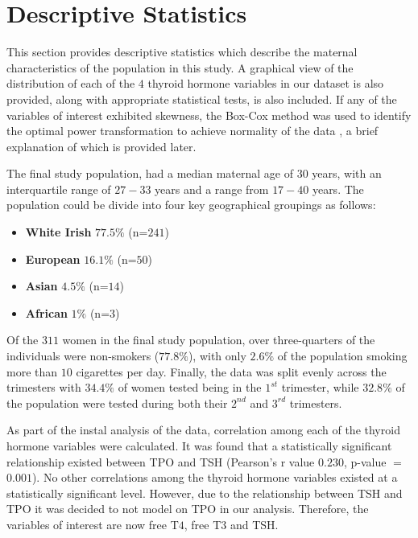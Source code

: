 \documentclass[12pt,a4paper]{report}
\begin{document}
\section{Descriptive Statistics}
This section provides descriptive statistics which describe the maternal characteristics of the population in this study. A graphical view of the distribution of each of the $4$ thyroid hormone variables in our dataset is also provided, along with appropriate statistical tests, is also included. If any of the variables of interest exhibited skewness, the Box-Cox method was used to identify the optimal power transformation to achieve normality of the data \citep{BoxCox1964}, a brief explanation of which is provided later.
\vspace{2mm}

The final study population, had a median maternal age of $30$ years, with an interquartile range of $27-33$ years and a range from $17-40$ years. The population could be divide into four key geographical groupings as follows:
\begin{itemize}
    \item {\textbf{White Irish}} $77.5\%$ (n=$241$)
    \item {\textbf{European}} $16.1\%$ (n=$50$)
    \item {\textbf{Asian}} $4.5\%$ (n=$14$)
    \item {\textbf{African}} $1\%$ (n=$3$)
\end{itemize}
\vspace{2mm}

Of the $311$ women in the final study population, over three-quarters of the individuals were non-smokers ($77.8\%$), with only $2.6\%$ of the population smoking more than $10$ cigarettes per day. Finally, the data was split evenly across the trimesters with $34.4\%$ of women tested being in the $1^{st}$ trimester, while $32.8\%$ of the population were tested during both their $2^{nd}$ and $3^{rd}$ trimesters.

\vspace{2mm}

As part of the instal analysis of the data, correlation among each of the thyroid hormone variables were calculated. It was found that a statistically significant relationship existed between TPO and TSH (Pearson's r value $0.230$, p-value $=$ $0.001$). No other correlations among the thyroid hormone variables existed at a statistically significant level. However, due to the relationship between TSH and TPO it was decided to not model on TPO in our analysis. Therefore, the variables of interest are now free T$4$, free T$3$ and TSH.
\end{document}
